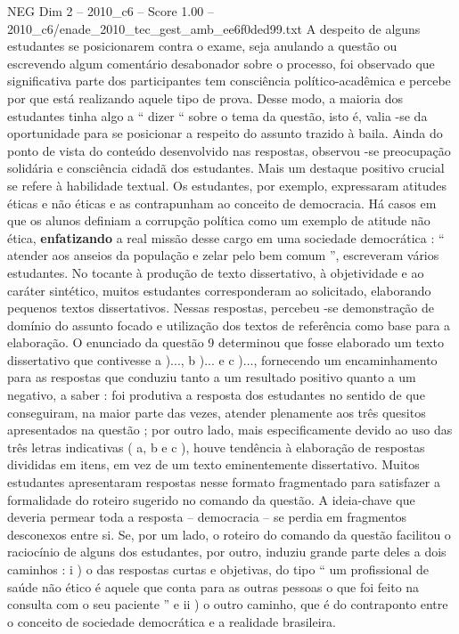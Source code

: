 \begin{textsample}{NEG Dim 2 – 2010\_c6 – Score 1.00 – 2010\_c6/enade\_2010\_tec\_gest\_amb\_ee6f0ded99.txt}
A despeito de alguns estudantes se posicionarem contra o exame, seja anulando a questão ou escrevendo algum comentário desabonador sobre o processo, foi observado que significativa parte dos participantes tem consciência político-acadêmica e percebe por que está realizando aquele tipo de prova.
Desse modo, a maioria dos estudantes tinha algo a “ dizer “ sobre o tema da questão, isto é, valia -se da oportunidade para se posicionar a respeito do assunto trazido à baila.
Ainda do ponto de vista do conteúdo desenvolvido nas respostas, observou -se preocupação solidária e consciência cidadã dos estudantes.
Mais um destaque positivo crucial se refere à habilidade textual.
Os estudantes, por exemplo, expressaram atitudes éticas e não éticas e as contrapunham ao conceito de democracia.
Há casos em que os alunos definiam a corrupção política como um exemplo de atitude não ética, \textbf{enfatizando} a real missão desse cargo em uma sociedade democrática : “ atender aos anseios da população e zelar pelo bem comum ”, escreveram vários estudantes.
No tocante à produção de texto dissertativo, à objetividade e ao caráter sintético, muitos estudantes corresponderam ao solicitado, elaborando pequenos textos dissertativos.
Nessas respostas, percebeu -se demonstração de domínio do assunto focado e utilização dos textos de referência como base para a elaboração.
O enunciado da questão 9 determinou que fosse elaborado um texto dissertativo que contivesse a )..., b )... e c )..., fornecendo um encaminhamento para as respostas que conduziu tanto a um resultado positivo quanto a um negativo, a saber : foi produtiva a resposta dos estudantes no sentido de que conseguiram, na maior parte das vezes, atender plenamente aos três quesitos apresentados na questão ; por outro lado, mais especificamente devido ao uso das três letras indicativas ( a, b e c ), houve tendência à elaboração de respostas divididas em itens, em vez de um texto eminentemente dissertativo.
Muitos estudantes apresentaram respostas nesse formato fragmentado para satisfazer a formalidade do roteiro sugerido no comando da questão.
A ideia-chave que deveria permear toda a resposta – democracia – se perdia em fragmentos desconexos entre si.
Se, por um lado, o roteiro do comando da questão facilitou o raciocínio de alguns dos estudantes, por outro, induziu grande parte deles a dois caminhos : i ) o das respostas curtas e objetivas, do tipo “ um profissional de saúde não ético é aquele que conta para as outras pessoas o que foi feito na consulta com o seu paciente ” e ii ) o outro caminho, que é do contraponto entre o conceito de sociedade democrática e a realidade brasileira.

\end{textsample}
